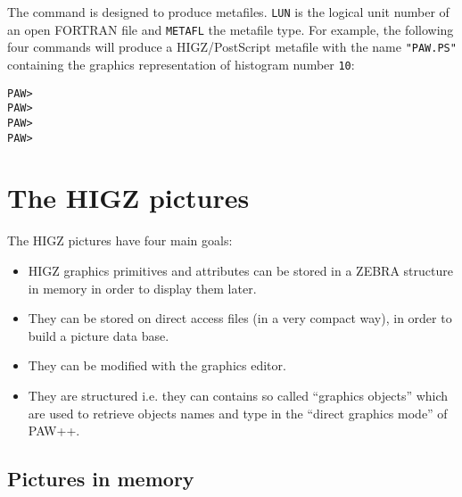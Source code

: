 The command  is designed
to produce metafiles. 
\texttt{LUN} is the logical unit number of an open
FORTRAN file and \texttt{METAFL} the metafile type.
For example, the following four commands
will produce a HIGZ/PostScript metafile with the name \texttt{"PAW.PS"}
containing the graphics representation of histogram number \texttt{10}:

\begin{alltt}
PAW > 
PAW > 
PAW > 
PAW > 
\end{alltt}

\section{The HIGZ pictures}
\label{sec:H2HIGZP}

The HIGZ pictures have four main goals:

\begin{itemize}
\item HIGZ graphics primitives and attributes can be stored
      in a ZEBRA structure in memory in order to display them later.
\item They can be stored on direct access files (in a very compact way), 
      in order to build a picture data base.
\item They can be modified with the graphics editor.
\item They are structured i.e. they can contains so called ``graphics objects''
      which are used to retrieve objects names and type in the ``direct
      graphics mode'' of PAW++.
\end{itemize}

\newpage

\subsection{Pictures in memory}
\label{sec:H3PICT}

